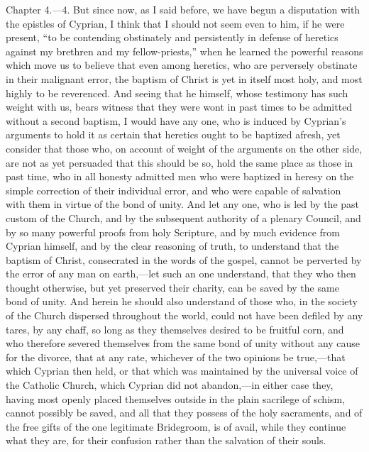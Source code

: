 
Chapter 4.—4. But since now, as I said before, we have begun a disputation with the epistles of Cyprian, I think that I should not seem even to him, if he were present, ``to be contending obstinately and persistently in defense of heretics against my brethren and my fellow-priests,'' when he learned the powerful reasons which move us to believe that even among heretics, who are perversely obstinate in their malignant error, the baptism of Christ is yet in itself most holy, and most highly to be reverenced. And seeing that he himself, whose testimony has such weight with us, bears witness that they were wont in past times to be admitted without a second baptism, I would have any one, who is induced by Cyprian’s arguments to hold it as certain that heretics ought to be baptized afresh, yet consider that those who, on account of weight of the arguments on the other side, are not as yet persuaded that this should be so, hold the same place as those in past time, who in all honesty admitted men who were baptized in heresy on the simple correction of their individual error, and who were capable of salvation with them in virtue of the bond of unity. And let any one, who is led by the past custom of the Church, and by the subsequent authority of a plenary Council, and by so many powerful proofs from holy Scripture, and by much evidence from Cyprian himself, and by the clear reasoning of truth, to understand that the baptism of Christ, consecrated in the words of the gospel, cannot be perverted by the error of any man on earth,—let such an one understand, that they who then thought otherwise, but yet preserved their charity, can be saved by the same bond of unity. And herein he should also understand of those who, in the society of the Church dispersed throughout the world, could not have been defiled by any tares, by any chaff, so long as they themselves desired to be fruitful corn, and who therefore severed themselves from the same bond of unity without any cause for the divorce, that at any rate, whichever of the two opinions be true,—that which Cyprian then held, or that which was maintained by the universal voice of the Catholic Church, which Cyprian did not abandon,—in either case they, having most openly placed themselves outside in the plain sacrilege of schism, cannot possibly be saved, and all that they possess of the holy sacraments, and of the free gifts of the one legitimate Bridegroom, is of avail, while they continue what they are, for their confusion rather than the salvation of their souls.

